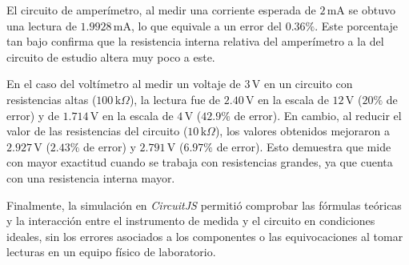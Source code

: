 El circuito de amperímetro, al medir una corriente esperada de $2\,\text{mA}$ se obtuvo una lectura de $1.9928\,\text{mA}$, lo que equivale a un error del $0.36\%$. Este porcentaje tan bajo confirma que la resistencia interna relativa del amperímetro a la del circuito de estudio altera muy poco a este.

En el caso del voltímetro al medir un voltaje de $3\,\text{V}$ en un circuito con resistencias altas ($100\,\text{k}\Omega$), la lectura fue de $2.40\,\text{V}$ en la escala de $12\,\text{V}$ ($20\%$ de error) y de $1.714\,\text{V}$ en la escala de $4\,\text{V}$ ($42.9\%$ de error). En cambio, al reducir el valor de las resistencias del circuito ($10\,\text{k}\Omega$), los valores obtenidos mejoraron a $2.927\,\text{V}$ ($2.43\%$ de error) y $2.791\,\text{V}$ ($6.97\%$ de error). Esto demuestra que mide con mayor exactitud cuando se trabaja con resistencias grandes, ya que cuenta con una resistencia interna mayor.

Finalmente, la simulación en \textit{CircuitJS} permitió comprobar las fórmulas teóricas y la interacción entre el instrumento de medida y el circuito en condiciones ideales, sin los errores asociados a los componentes o las equivocaciones al tomar lecturas en un equipo físico de laboratorio.
